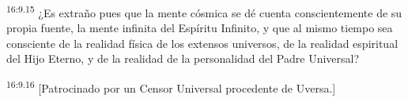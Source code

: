 \par
\textsuperscript{16:9.15} ¿Es extraño pues que la mente cósmica se dé cuenta conscientemente de su propia fuente, la mente infinita del Espíritu Infinito, y que al mismo tiempo sea consciente de la realidad física de los extensos universos, de la realidad espiritual del Hijo Eterno, y de la realidad de la personalidad del Padre Universal?

\par
\textsuperscript{16:9.16} [Patrocinado por un Censor Universal procedente de Uversa.]
